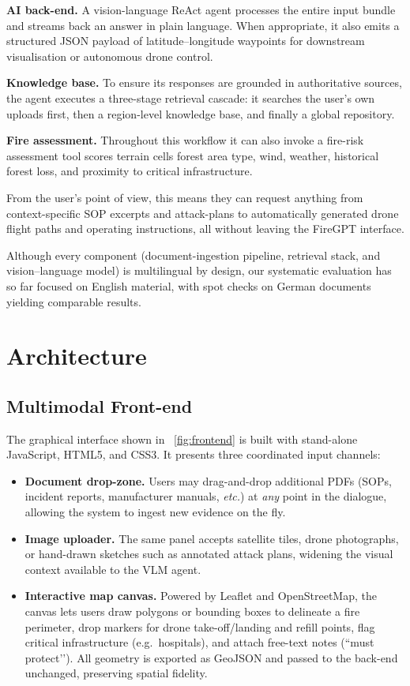 \documentclass[lang=english,inputenc=utf8,fontsize=10pt]{ldvarticle}
\begin{document}
\textbf{AI back-end.}
A vision-language ReAct agent processes the entire input bundle and
streams back an answer in plain language.  When appropriate, it also emits
a structured JSON payload of latitude–longitude waypoints for downstream
visualisation or autonomous drone control.

\textbf{Knowledge base.}
To ensure its responses are grounded in authoritative sources, the agent
executes a three-stage retrieval cascade: it searches the user’s own
uploads first, then a region-level knowledge base, and finally a global
repository.  

\textbf{Fire assessment.}
Throughout this workflow it can also invoke a fire-risk assessment
tool scores terrain cells forest area type, wind, weather, historical forest loss,
and proximity to critical infrastructure.

From the user’s point of view, this means they can request anything from
context-specific SOP excerpts and attack-plans to automatically
generated drone flight paths and operating instructions, all without
leaving the FireGPT interface.

Although every component (document-ingestion pipeline, retrieval
stack, and vision–language model) is multilingual by design, our systematic
evaluation has so far focused on English material, with spot checks on
German documents yielding comparable results.

\section*{Architecture}
\subsection*{Multimodal Front-end}
The graphical interface shown in ~\cref{fig:frontend} is built with
stand-alone JavaScript, HTML5, and CSS3.  It presents three coordinated
input channels:

\begin{itemize}
  \item \textbf{Document drop-zone.} Users may drag-and-drop additional
        PDFs (SOPs, incident reports, manufacturer manuals, \emph{etc.})
        at \emph{any} point in the dialogue, allowing the system to ingest
        new evidence on the fly.
  \item \textbf{Image uploader.} The same panel accepts satellite tiles,
        drone photographs, or hand-drawn sketches such as annotated attack
        plans, widening the visual context available to the VLM agent.
  \item \textbf{Interactive map canvas.} Powered by Leaflet and OpenStreetMap, 
        the canvas lets users draw polygons or bounding boxes to
        delineate a fire perimeter, drop markers for drone
        take-off/landing and refill points, flag critical infrastructure
        (e.g.\ hospitals), and attach free-text notes (``must
        protect’’).  All geometry is exported as GeoJSON and passed to the
        back-end unchanged, preserving spatial fidelity.
\end{itemize}
\end{document}
